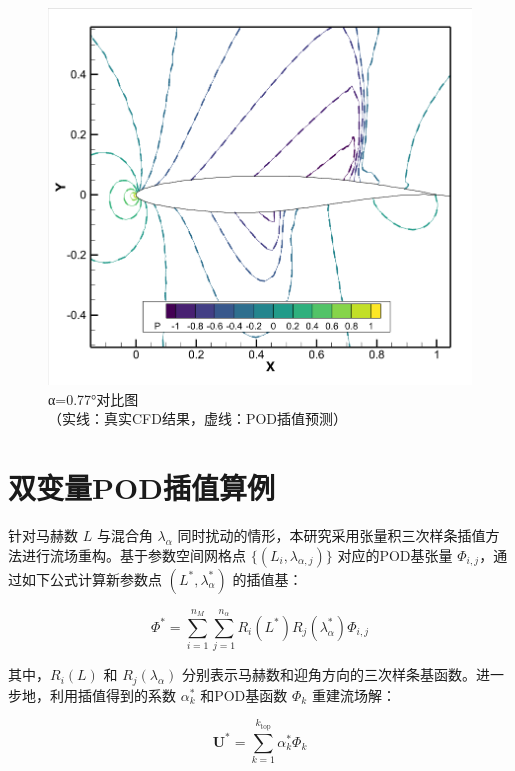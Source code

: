 \begin{figure}[H]
    \centering
    \includegraphics[width=0.7\linewidth]{0.77对比图.png}
     \caption{\songti α=0.77°对比图\\
{\songti\footnotesize （实线：真实CFD结果，虚线：POD插值预测）}}
    \label{fig:alpha0.77_result}
\end{figure}
\label{sec:double_variable_pod}
\section{双变量POD插值算例}
针对马赫数 \( L \) 与混合角 \( \lambda_\alpha \) 同时扰动的情形，本研究采用张量积三次样条插值方法进行流场重构。基于参数空间网格点 \(\{(L_i, \lambda_{\alpha,j})\}\) 对应的POD基张量 \(\Phi_{i,j}\)，通过如下公式计算新参数点 \((L^*, \lambda_\alpha^*)\) 的插值基：

\begin{equation}
    \Phi^* = \sum_{i=1}^{n_M} \sum_{j=1}^{n_\alpha} R_i(L^*) R_j(\lambda_\alpha^*) \Phi_{i,j}
    \label{eq:double_spline}
\end{equation}

其中，\( R_i(L) \) 和 \( R_j(\lambda_\alpha) \) 分别表示马赫数和迎角方向的三次样条基函数。进一步地，利用插值得到的系数 \(\alpha_k^*\) 和POD基函数 \(\Phi_k\) 重建流场解：

\begin{equation}
    \mathbf{U}^* = \sum_{k=1}^{k_{\text{top}}} \alpha_k^* \Phi_k
    \label{eq:double_solution}
\end{equation}

